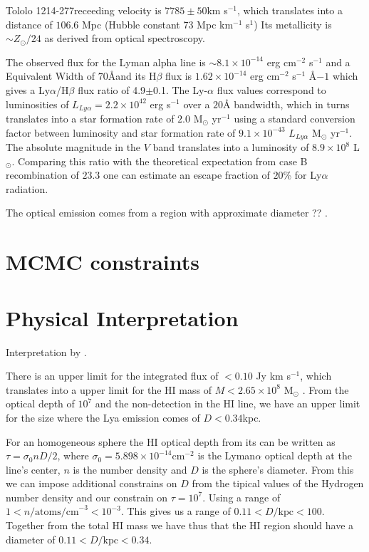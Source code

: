 \documentclass[a4paper, usenatbib, 12pt]{article}
\newcommand{\tol}{Tololo 1214-277}
\begin{document}
{\tol receeding velocity is $7785\pm 50$km s$^{-1}$, which translates
into a distance of $106.6$ Mpc (Hubble constant 73 Mpc km$^{-1}$
s$^{1}$)
Its metallicity is $\sim Z_{\odot}/24$ \cite{Izotov04} as derived from optical
spectroscopy. 


The observed flux for the Lyman alpha line is $\sim
8.1\times 10^{-14}$ erg cm$^{-2}$ s$^{-1}$ \cite{Thuan97}
and a Equivalent Width of $70$\AA and its H$\beta$ flux is 
$1.62\times 10^{-14}$ erg cm$^{-2}$ s$^{-1}$ \AA${-1}$
\cite{Izotov04} which gives a Ly$\alpha$/H$\beta$ flux ratio of
4.9$\pm$0.1. The Ly-$\alpha$ flux values correspond to luminosities of
$L_{Ly\alpha}=2.2\times 10^{42}$ erg s$^{-1}$ over a $20$\AA
bandwidth, which in turns translates  into a star formation rate of
$2.0$ M$_{\odot}$ yr$^{-1}$ using a standard conversion factor between
luminosity and star formation rate of $9.1\times 10^{-43}$
$L_{Ly\alpha}$ M$_{\odot}$ yr$^{-1}$. 
The absolute magnitude in the $V$ band translates into a luminosity of
$8.9\times 10^{8}$ L$_{\odot}$.
Comparing this ratio with the theoretical expectation from case B
recombination of $23.3$ \cite{Hummer1987} one can estimate an escape
fraction of $20$\% for Ly$\alpha$ radiation.

The optical emission  comes from a   region with approximate diameter
?? \cite{Fricke01}. 

\section*{MCMC constraints}

\section*{Physical Interpretation}

Interpretation by \cite{mashesse03}.

There is an upper limit for the  
integrated flux of $<0.10$ Jy km s$^{-1}$, which translates into a
upper limit for the HI mass of $M<2.65\times 10^{8}$ M$_{\odot}$
\cite{pustilnikmartin07}. 
From the optical depth of $10^7$ and the non-detection in the HI line,
we have an upper limit for the size where the Lya emission comes of
$D<0.34$kpc. 

 For an homogeneous sphere the HI optical depth from its can be
 written as $\tau = \sigma_0 n D/2$, where $\sigma_0=5.898\times
10^{-14}$cm$^{-2}$ is the Lyman$\alpha$  optical depth at the 
line's center, $n$ is the number density and $D$ is the sphere's
diameter. 
From this we can impose additional constrains on $D$ from the tipical
values of the Hydrogen number density and our constrain on
$\tau=10^{7}$.  Using a range of $1<n/\mathrm{atoms/cm}^{-3} <
10^{-3}$. This gives us a range of $0.11 < D/\mathrm{kpc}<100$. 
Together from the total HI mass we have thus that the HI region should
have a diameter of $0.11 < D/\mathrm{kpc}<0.34$.



}
\end{document}
